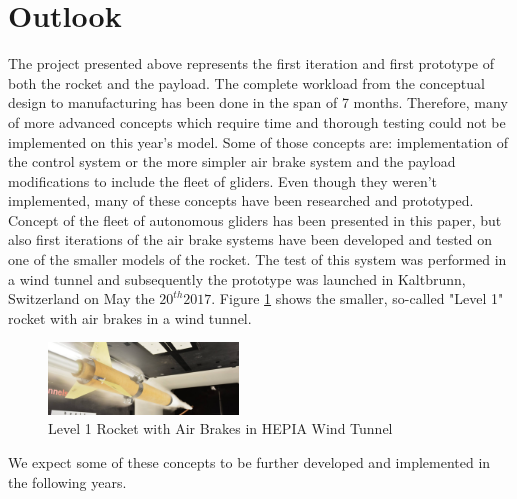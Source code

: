 \documentclass[]{iac}
\begin{document}
\section{Outlook}
The project presented above represents the first iteration and first prototype of both the rocket and the payload. The complete workload from the conceptual design to manufacturing has been done in the span of 7 months. Therefore, many of more advanced concepts which require time and thorough testing could not be implemented on this year's model. Some of those concepts are: implementation of the control system or the more simpler air brake system and the payload modifications to include the fleet of gliders. Even though they weren't implemented, many of these concepts have been researched and prototyped. Concept of the fleet of autonomous gliders has been presented in this paper, but also first iterations of the air brake systems have been developed and tested on one of the smaller models of the rocket. The test of this system was performed in a wind tunnel and subsequently the prototype was launched in Kaltbrunn, Switzerland on May the $20^{th} 2017$. Figure \ref{f:level1_airbrake} shows the smaller, so-called "Level 1" rocket with air brakes in a wind tunnel. 

  \begin{figure}[h!]
 	\centering
        \includegraphics[width=0.45\textwidth]{img/level1.png}
        \caption{Level 1 Rocket with Air Brakes in HEPIA Wind Tunnel}
        \label{f:level1_airbrake}
 \end{figure}

We expect some of these concepts to be further developed and implemented in the following years.






\end{document}
